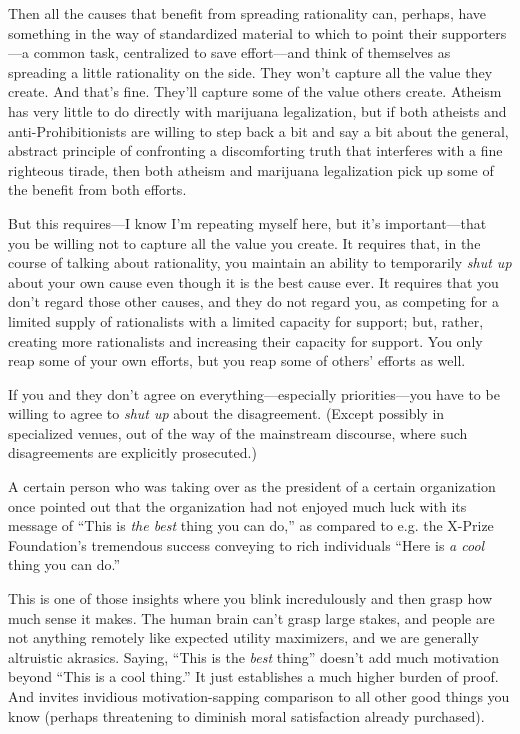 {
 Then all the causes that benefit from spreading rationality can,
perhaps, have something in the way of standardized material to which to
point their supporters---a common task, centralized to save
effort---and think of themselves as spreading a little rationality on
the side. They won't capture all the value they create.
And that's fine. They'll capture some
of the value others create. Atheism has very little to do directly with
marijuana legalization, but if both atheists and anti-Prohibitionists
are willing to step back a bit and say a bit about the general,
abstract principle of confronting a discomforting truth that interferes
with a fine righteous tirade, then both atheism and marijuana
legalization pick up some of the benefit from both efforts.}

{
 But this requires---I know I'm repeating myself
here, but it's important---that you be willing not to
capture all the value you create. It requires that, in the course of
talking about rationality, you maintain an ability to temporarily
\textit{shut up} about your own cause even though it is the best cause
ever. It requires that you don't regard those other
causes, and they do not regard you, as competing for a limited supply
of rationalists with a limited capacity for support; but, rather,
creating more rationalists and increasing their capacity for support.
You only reap some of your own efforts, but you reap some of
others' efforts as well.}

{
 If you and they don't agree on
everything---especially priorities---you have to be willing to agree to
\textit{shut up} about the disagreement. (Except possibly in
specialized venues, out of the way of the mainstream discourse, where
such disagreements are explicitly prosecuted.)}

{
 A certain person who was taking over as the president of a certain
organization once pointed out that the organization had not enjoyed
much luck with its message of ``This is \textit{the
best} thing you can do,'' as compared to e.g. the
X-Prize Foundation's tremendous success conveying to
rich individuals ``Here is \textit{a cool} thing you
can do.''}

{
 This is one of those insights where you blink incredulously and
then grasp how much sense it makes. The human brain
can't grasp large stakes, and people are not anything
remotely like expected utility maximizers, and we are generally
altruistic akrasics. Saying, ``This is the
\textit{best} thing'' doesn't add
much motivation beyond ``This is a cool
thing.'' It just establishes a much higher burden of
proof. And invites invidious motivation-sapping comparison to all other
good things you know (perhaps threatening to diminish moral
satisfaction already purchased).}

